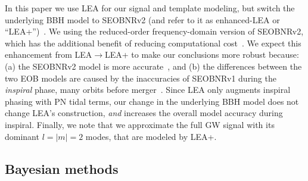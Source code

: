 \documentclass[aps,prd,amsmath,floats,floatfix, twocolumn,
superscriptaddress,nofootinbib,showpacs]{revtex4-1}
\newcommand{\red}{\textcolor{red}}
\begin{document}
In this paper we use LEA for our signal and template modeling, but switch the 
underlying BBH model to SEOBNRv2 (and refer to it as enhanced-LEA or
``LEA+'')~\cite{Taracchini:2013rva}. We using the reduced-order
frequency-domain version of SEOBNRv2, which has the additional benefit of
reducing computational cost~\cite{Purrer:2015tud}. We expect this enhancement
from LEA$\rightarrow$LEA+ to make our conclusions more robust because: (a) the 
SEOBNRv2 model is more accurate~\cite{Kumar:2015tha,Kumar:2016dhh}, and (b)
the differences between the two EOB models are caused by the
inaccuracies of SEOBNRv1 during the {\it inspiral} phase, many orbits before 
merger~\cite{Kumar:2015tha}.
Since LEA only augments inspiral phasing with PN tidal terms, our
change in the underlying BBH model does not change LEA's construction, {\it and}
increases the overall model accuracy during inspiral.
% 
Finally, we note that we approximate the full GW signal with its dominant
$l=|m|=2$ modes, that are modeled by LEA+.


\subsection{Bayesian methods}\label{s2:bayesian}
\end{document}
